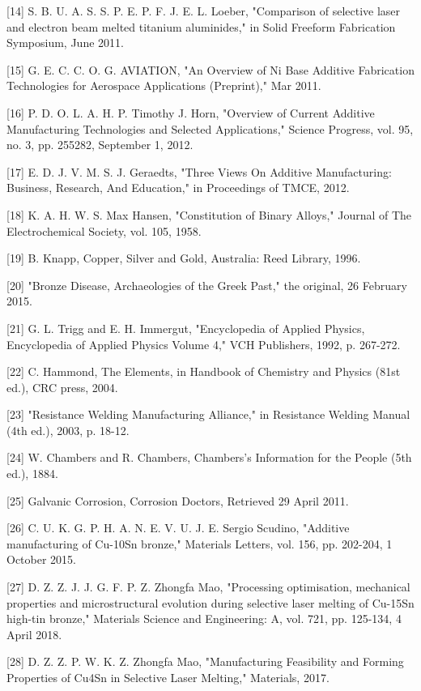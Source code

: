 \documentclass[10pt]{article}
\begin{document}
[14] S. B. U. A. S. S. P. E. P. F. J. E. L. Loeber, "Comparison of selective laser and electron beam melted titanium aluminides," in Solid Freeform Fabrication Symposium, June 2011.

[15] G. E. C. C. O. G. AVIATION, "An Overview of Ni Base Additive Fabrication Technologies for Aerospace Applications (Preprint)," Mar 2011.

[16] P. D. O. L. A. H. P. Timothy J. Horn, "Overview of Current Additive Manufacturing Technologies and Selected Applications," Science Progress, vol. 95, no. 3, pp. 255282, September 1, 2012.

[17] E. D. J. V. M. S. J. Geraedts, "Three Views On Additive Manufacturing: Business, Research, And Education," in Proceedings of TMCE, 2012.

[18] K. A. H. W. S. Max Hansen, "Constitution of Binary Alloys," Journal of The Electrochemical Society, vol. 105, 1958.

[19] B. Knapp, Copper, Silver and Gold, Australia: Reed Library, 1996.

[20] "Bronze Disease, Archaeologies of the Greek Past," the original, 26 February 2015.

[21] G. L. Trigg and E. H. Immergut, "Encyclopedia of Applied Physics, Encyclopedia of Applied Physics Volume 4," VCH Publishers, 1992, p. 267-272.

[22] C. Hammond, The Elements, in Handbook of Chemistry and Physics (81st ed.), CRC press, 2004.

[23] "Resistance Welding Manufacturing Alliance," in Resistance Welding Manual (4th ed.), 2003, p. 18-12.

[24] W. Chambers and R. Chambers, Chambers's Information for the People (5th ed.), 1884.

[25] Galvanic Corrosion, Corrosion Doctors, Retrieved 29 April 2011.

[26] C. U. K. G. P. H. A. N. E. V. U. J. E. Sergio Scudino, "Additive manufacturing of Cu-10Sn bronze," Materials Letters, vol. 156, pp. 202-204, 1 October 2015.

[27] D. Z. Z. J. J. G. F. P. Z. Zhongfa Mao, "Processing optimisation, mechanical properties and microstructural evolution during selective laser melting of Cu-15Sn high-tin bronze," Materials Science and Engineering: A, vol. 721, pp. 125-134, 4 April 2018.

[28] D. Z. Z. P. W. K. Z. Zhongfa Mao, "Manufacturing Feasibility and Forming Properties of Cu4Sn in Selective Laser Melting," Materials, 2017.
\end{document}
